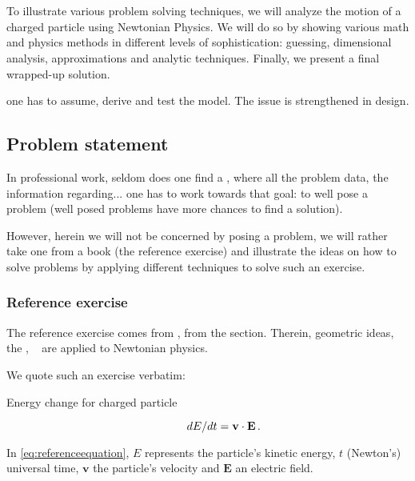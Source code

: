 \chapter{\docTitle}
%
To illustrate various problem solving techniques, we will analyze the motion of a charged particle using Newtonian Physics. We will do so by showing various math and physics methods in different levels of sophistication: guessing, dimensional analysis, approximations and analytic techniques. Finally, we present a final wrapped-up solution.

one has to assume, derive and test the model. The issue is strengthened in design.


\section{Problem statement}
%
In professional work, seldom does one find a , where all the problem data, the information regarding...  one has to work towards that goal: to well pose a problem (well posed problems have more chances to find a solution).

However, herein we will not be concerned by posing a problem, we will rather take one from a book (the reference exercise) and illustrate the ideas on how to solve problems by applying different techniques to solve such an exercise.


\subsection{Reference exercise}\label{sec:reference}
%
The reference exercise comes from \cite[chap. 1]{thorne:2011}, from the  section. Therein, geometric ideas, \via the ,
%
~
%
are applied to Newtonian physics. 

We quote such an exercise verbatim:
%
\begin{description}
%
\item[Energy change for charged particle] 
%
\begin{equation}\label{eq:referenceequation}
  dE/dt = \mathbf{v}\cdot\mathbf{E}\,.
\end{equation}
%
\end{description}
%
In \cref{eq:referenceequation}, $E$ represents the particle's kinetic energy, $t$ (Newton's) universal time, $\mathbf{v}$ the particle's velocity and $\mathbf{E}$ an electric field.


